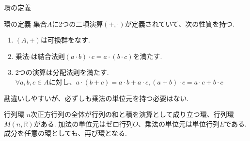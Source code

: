 \documentclass[dvipdfmx,11pt,notheorems]{beamer}
\begin{document}
\begin{frame}{環の定義}
  \begin{block}{環の定義}
    集合$A$に2つの二項演算$(+,\cdot)$が定義されていて、次の性質を持つ.
    \begin{enumerate}
      \item $(A,+)$は可換群をなす.
      \item 乗法$\cdot$は結合法則$(a\cdot b)\cdot c=a\cdot(b\cdot c)$を満たす.
      \item 2つの演算は\alert{分配法則}を満たす.\\
      $\forall a,b,c \in A$に対し、$a\cdot(b+c)=a\cdot b + a\cdot c,    (a+b)\cdot c=a\cdot c+b\cdot c$
    \end{enumerate}
    勘違いしやすいが、必ずしも乗法の単位元を持つ必要はない. \\

  \end{block}
  \begin{exampleblock}{行列環}
    $n$次正方行列の全体が行列の和と積を演算として成り立つ環、行列環$M(n,\mathbb{R})$がある. 加法の単位元はゼロ行列$O$、乗法の単位元は単位行列$E$である.\\
    成分を任意の環としても、再び環となる.
  \end{exampleblock}
\end{frame}
\end{document}
